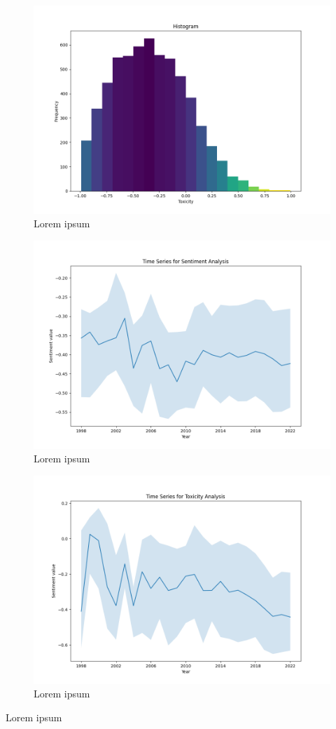 \begin{figure}[!htb]
    \centering
    \includegraphics[width=\textwidth]{figures/toxicity_histogram.png}
    \caption[]{Lorem ipsum}
\end{figure}

\begin{figure}[!htb]
    \centering
    \includegraphics[width=\textwidth]{figures/time_series_sentiment.png}
    \caption[]{Lorem ipsum}
\end{figure}

\begin{figure}[!htb]
    \centering
    \includegraphics[width=\textwidth]{figures/time_series_toxicity.png}
    \caption[]{Lorem ipsum}
\end{figure}

Lorem ipsum